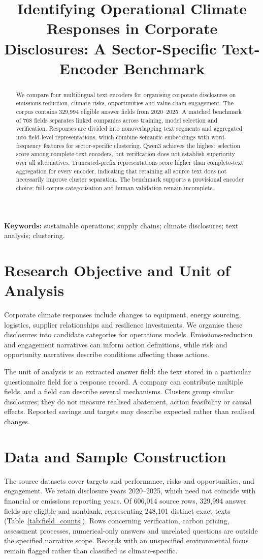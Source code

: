 \documentclass[12pt]{article}
\title{Identifying Operational Climate Responses in Corporate Disclosures: A Sector-Specific Text-Encoder Benchmark}
\author{}
\date{}
\begin{document}
\maketitle

\begin{abstract}
We compare four multilingual text encoders for organising corporate disclosures on emissions reduction, climate risks, opportunities and value-chain engagement. The corpus contains 329,994 eligible answer fields from 2020--2025. A matched benchmark of 768 fields separates linked companies across training, model selection and verification. Responses are divided into nonoverlapping text segments and aggregated into field-level representations, which combine semantic embeddings with word-frequency features for sector-specific clustering. Qwen3 achieves the highest selection score among complete-text encoders, but verification does not establish superiority over all alternatives. Truncated-prefix representations score higher than complete-text aggregation for every encoder, indicating that retaining all source text does not necessarily improve cluster separation. The benchmark supports a provisional encoder choice; full-corpus categorisation and human validation remain incomplete.
\end{abstract}
\noindent\textbf{Keywords:} sustainable operations; supply chains; climate disclosures; text analysis; clustering.

\section{Research Objective and Unit of Analysis}
Corporate climate responses include changes to equipment, energy sourcing, logistics, supplier relationships and resilience investments. We organise these disclosures into candidate categories for operations models. Emissions-reduction and engagement narratives can inform action definitions, while risk and opportunity narratives describe conditions affecting those actions.

The unit of analysis is an extracted answer field: the text stored in a particular questionnaire field for a response record. A company can contribute multiple fields, and a field can describe several mechanisms. Clusters group similar disclosures; they do not measure realised abatement, action feasibility or causal effects. Reported savings and targets may describe expected rather than realised changes.

\section{Data and Sample Construction}
The source datasets cover targets and performance, risks and opportunities, and engagement. We retain disclosure years 2020--2025, which need not coincide with financial or emissions reporting years. Of 606,014 source rows, 329,994 answer fields are eligible and nonblank, representing 248,101 distinct exact texts (Table~\ref{tab:field_counts}). Rows concerning verification, carbon pricing, assessment processes, numerical-only answers and unrelated questions are outside the specified narrative scope. Records with an unspecified environmental focus remain flagged rather than classified as climate-specific.
\end{document}
